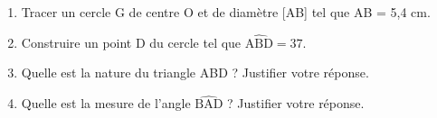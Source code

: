 
\medskip

\begin{enumerate}
\item Tracer un cercle G de centre O et de diamètre [AB] tel que AB = 5,4 cm.
\item Construire un point D du cercle tel que $\widehat{\text{ABD}} = 37$\degres.
\item Quelle est la nature du triangle ABD ? Justifier votre réponse.
\item Quelle est la mesure de l'angle $\widehat{\text{BAD}}$ ? Justifier votre réponse.
\end{enumerate}


